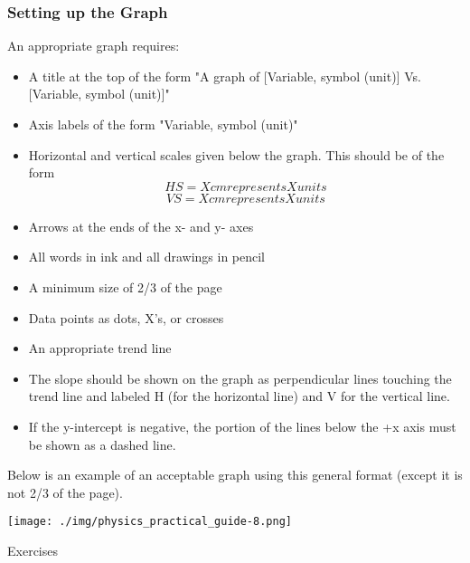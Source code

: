 \subsubsection{Setting up the Graph}
An appropriate graph requires:
\begin{itemize}
\item A title at the top of the form "A graph of [Variable, symbol (unit)] Vs. [Variable, symbol (unit)]"
\item Axis labels of the form "Variable, symbol (unit)"
\item Horizontal and vertical scales given below the graph. This should be of the form
	$$ HS= X cm represents X units$$
	$$ VS= X cm represents X units$$
\item Arrows at the ends of the x- and y- axes
\item All words in ink and all drawings in pencil
\item A minimum size of 2/3 of the page
\item Data points as dots, X's, or crosses
\item An appropriate trend line
\item The slope should be shown on the graph as perpendicular lines touching the trend line and labeled H (for the horizontal line) and V for the vertical line.
\item If the y-intercept is negative, the portion of the lines below the +x axis must be shown as a dashed line.
\end{itemize}

Below is an example of an acceptable graph using this general format (except it is not 2/3 of the page).

\begin{center}
\texttt{[image: ./img/physics\_practical\_guide-8.png]}
\end{center}

Exercises

